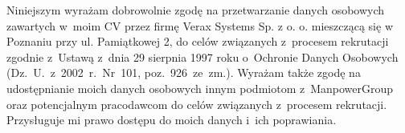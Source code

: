 \documentclass[10pt,a4paper]{moderncv}
\begin{document}
\renewcommand{\listitemsymbol}{-} %


\vfill
\begin{center}
\scriptsize Niniejszym wyrażam dobrowolnie zgodę na przetwarzanie danych osobowych zawartych w~moim CV przez firmę Verax Systems Sp. z o. o. mieszczącą się w Poznaniu przy ul. Pamiątkowej 2, do celów związanych z~procesem rekrutacji zgodnie z~Ustawą z~dnia 29 sierpnia 1997 roku o~Ochronie Danych Osobowych (Dz.~U.~z~2002~r.~Nr~101, poz.~926~ze~zm.). Wyrażam także zgodę na udostępnianie moich danych osobowych innym podmiotom z~ManpowerGroup oraz potencjalnym pracodawcom do celów związanych z~procesem rekrutacji. Przysługuje mi prawo dostępu do moich danych i~ich poprawiania.
\end{center}
\end{document}
